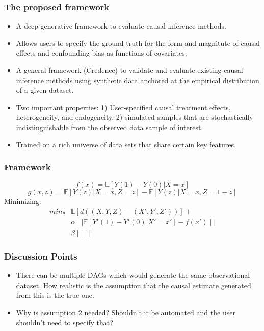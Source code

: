 \documentclass{beamer}
\begin{document}
\begin{frame}
	\frametitle{The proposed framework}
	\begin{itemize}
		\item A deep generative framework to evaluate causal inference methods.
		\item Allows users to specify the ground truth for the form and magnitute of causal effects and confounding bias as functions of covariates.
		\item A general framework (Credence) to validate and evaluate existing causal inference methods using synthetic data anchored at the empirical distribution of a given dataset.
		\item Two important properties: 1) User-specified causal treatment effects, heterogeneity, and endogeneity. 2) simulated samples that are stochastically indistinguishable from the observed data sample of interest.
		\item Trained on a rich universe of data sets that share certain key features.
	\end{itemize}
\end{frame}

\begin{frame}
	\frametitle{Framework}
	$$ f(x) = \mathbb{E}[Y(1) - Y(0)| X=x] $$
	$$ g(x, z) = \mathbb{E}[Y(z) | X=x, Z=z] - \mathbb{E}[Y(z) | X=x, Z=1-z ] $$
	Minimizing:
\begin{equation}
	\begin{split}
	\textit{min}_{\theta} & \mathbb{E}[d((X, Y, Z) - (X', Y', Z'))] + \\
			& \alpha \mid\mid \mathbb{E}[Y'(1) - Y'(0) | X'=x'] - f(x') \mid\mid \\
			& \beta \mid\mid \mid\mid
\end{split}
\end{equation}
\end{frame}

\begin{frame}
	\frametitle{Discussion Points}
	\begin{itemize}
		\item There can be multiple DAGs which would generate the same observational dataset. How realistic is the assumption that the causal estimate generated from this is the true one.
		\item Why is assumption 2 needed? Shouldn't it be automated and the user shouldn't need to specify that?
	\end{itemize}
\end{frame}
\end{document}
